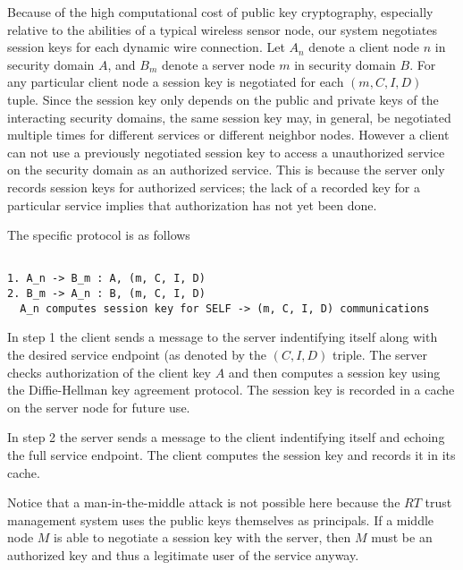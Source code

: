 Because of the high computational cost of public key cryptography, especially relative to the
abilities of a typical wireless sensor node, our system negotiates session keys for each dynamic
wire connection. Let $A_n$ denote a client node $n$ in security domain $A$, and $B_m$ denote a
server node $m$ in security domain $B$. For any particular client node a session key is
negotiated for each $(m, C, I, D)$ tuple. Since the session key only depends on the public and
private keys of the interacting security domains, the same session key may, in general, be
negotiated multiple times for different services or different neighbor nodes. However a client
can not use a previously negotiated session key to access a unauthorized service on the security
domain as an authorized service. This is because the server only records session keys for
authorized services; the lack of a recorded key for a particular service implies that
authorization has not yet been done.

The specific protocol is as follows
\begin{verbatim}

1. A_n -> B_m : A, (m, C, I, D)
2. B_m -> A_n : B, (m, C, I, D)
  A_n computes session key for SELF -> (m, C, I, D) communications

\end{verbatim}

In step 1 the client sends a message to the server indentifying itself along with the desired
service endpoint (as denoted by the $(C, I, D)$ triple. The server checks authorization of the
client key $A$ and then computes a session key using the Diffie-Hellman key agreement protocol.
The session key is recorded in a cache on the server node for future use.

In step 2 the server sends a message to the client indentifying itself and echoing the full
service endpoint. The client computes the session key and records it in its cache.

Notice that a man-in-the-middle attack is not possible here because the $RT$ trust management
system uses the public keys themselves as principals. If a middle node $M$ is able to negotiate
a session key with the server, then $M$ must be an authorized key and thus a legitimate user of
the service anyway.